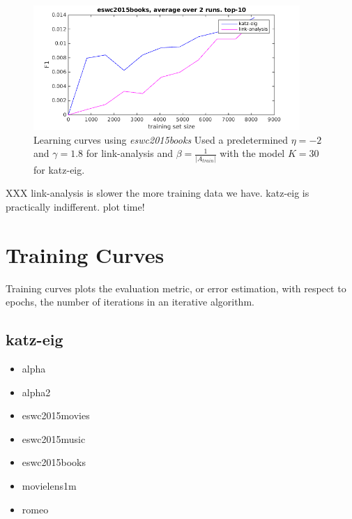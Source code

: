 \begin{figure}[h]
  \centering
    \includegraphics[width=0.9\textwidth]{fig/learning_curves/eswc2015books_learning_curves.png}
    \caption{Learning curves using \textit{eswc2015books}
        Used a predetermined $\eta = -2$ and $\gamma = 1.8$ for link-analysis and $\beta = \frac{1}{|A_{train}|}$ with the model $K = 30$ for katz-eig.}
\end{figure}




XXX link-analysis is slower the more training data we have.
katz-eig is practically indifferent.
plot time!

\FloatBarrier


\section{Training Curves}\label{sec:training_curves}

Training curves plots the evaluation metric, or error estimation, with respect to epochs, the number of iterations in an iterative algorithm.

\subsection{katz-eig}

\begin{itemize}
    \item alpha
    \item alpha2
    \item eswc2015movies
    \item eswc2015music
    \item eswc2015books
    \item movielens1m
    \item romeo
\end{itemize}


